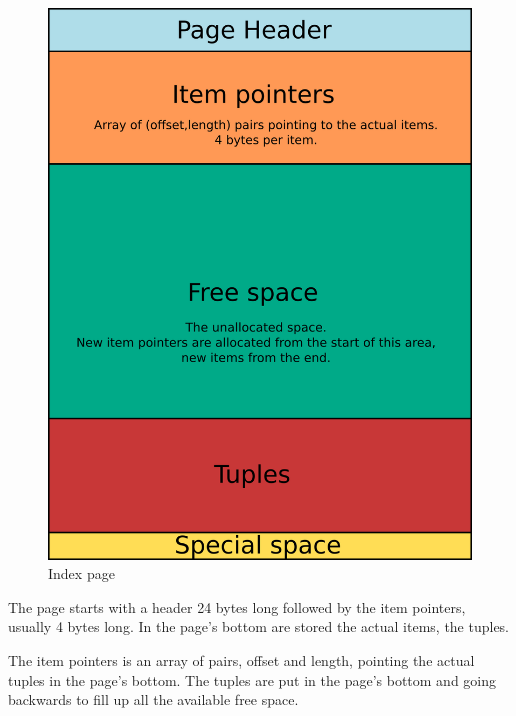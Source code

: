 \begin{figure}[H]
\begin{center}

\includegraphics[scale=0.35]{images/index_page_01.png}

\caption{Index page}
\label{fig:INDEX01} 
\end{center}

\end{figure}

The page starts with a header 24 bytes long followed 
by 
the item pointers, usually 4 bytes long. In the page's bottom are stored the 
actual items, the tuples.\newline

The item pointers is an array of pairs, offset and 
length, pointing the actual tuples in the page's bottom. The tuples are put in 
the page's bottom and going backwards to fill up all the available free 
space.\newline 

